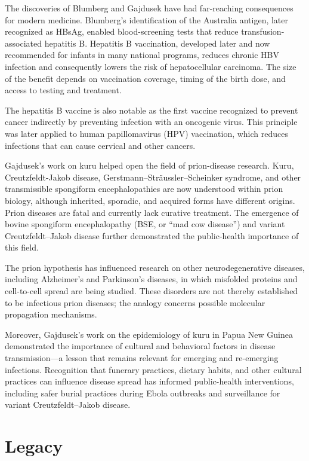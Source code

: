 The discoveries of Blumberg and Gajdusek have had far-reaching consequences for modern medicine. Blumberg's identification of the Australia antigen, later recognized as HBsAg, enabled blood-screening tests that reduce transfusion-associated hepatitis B. Hepatitis B vaccination, developed later and now recommended for infants in many national programs, reduces chronic HBV infection and consequently lowers the risk of hepatocellular carcinoma. The size of the benefit depends on vaccination coverage, timing of the birth dose, and access to testing and treatment.

The hepatitis B vaccine is also notable as the first vaccine recognized to prevent cancer indirectly by preventing infection with an oncogenic virus. This principle was later applied to human papillomavirus (HPV) vaccination, which reduces infections that can cause cervical and other cancers.

Gajdusek's work on kuru helped open the field of prion-disease research. Kuru, Creutzfeldt-Jakob disease, Gerstmann--Str\"aussler--Scheinker syndrome, and other transmissible spongiform encephalopathies are now understood within prion biology, although inherited, sporadic, and acquired forms have different origins. Prion diseases are fatal and currently lack curative treatment. The emergence of bovine spongiform encephalopathy (BSE, or ``mad cow disease'') and variant Creutzfeldt--Jakob disease further demonstrated the public-health importance of this field.

The prion hypothesis has influenced research on other neurodegenerative diseases, including Alzheimer's and Parkinson's diseases, in which misfolded proteins and cell-to-cell spread are being studied. These disorders are not thereby established to be infectious prion diseases; the analogy concerns possible molecular propagation mechanisms.

Moreover, Gajdusek's work on the epidemiology of kuru in Papua New Guinea demonstrated the importance of cultural and behavioral factors in disease transmission---a lesson that remains relevant for emerging and re-emerging infections. Recognition that funerary practices, dietary habits, and other cultural practices can influence disease spread has informed public-health interventions, including safer burial practices during Ebola outbreaks and surveillance for variant Creutzfeldt--Jakob disease.

\section{Legacy}

